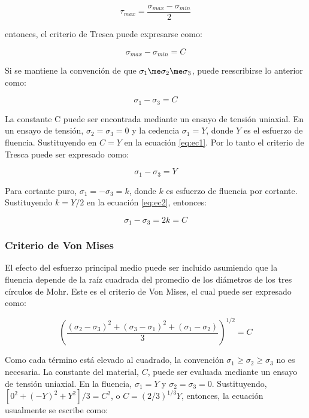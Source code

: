 \begin{equation}
\tau_{max} = \frac{\sigma_{max}-\sigma_{min}}{2}
\end{equation}

entonces, el criterio de Tresca puede expresarse como:

\begin{equation}
\sigma_{max} - \sigma_{min} = C
\end{equation}

Si se mantiene la convención de que $ \sigma_1 \me \sigma_2 \me \sigma_3 $, puede reescribirse lo anterior como:

\begin{equation}\label{eq:ec1}
\sigma_1 - \sigma_3 = C
\end{equation}

La constante C puede ser encontrada mediante un ensayo de tensión uniaxial. En un ensayo de tensión, 
$\sigma_2 = \sigma_3 = 0$ y la cedencia $\sigma_1 = Y$, donde $Y$ es el esfuerzo de fluencia. Sustituyendo 
en $C=Y$ en la ecuación \ref{eq:ec1}. Por lo tanto el criterio de Tresca puede ser expresado como:

\begin{equation}\label{eq:ec2}
\sigma_1 - \sigma_3 = Y
\end{equation}

Para cortante puro, $ \sigma_1 = -\sigma_3 = k$, donde $k$ es esfuerzo de fluencia por cortante. Sustituyendo 
$ k = Y/2 $ en la ecuación \ref{eq:ec2}, entonces:

\begin{equation}
\sigma_1 - \sigma_3 = 2k = C
\end{equation}

\subsubsection{Criterio de Von Mises}

El efecto del esfuerzo principal medio puede ser incluido asumiendo que la fluencia depende de la raíz cuadrada 
del promedio de los diámetros de los tres círculos de Mohr. Este es el criterio de Von Mises, el cual puede ser 
expresado como:

\begin{equation} \label{eq:ec3}
\left( \frac{ (\sigma_2-\sigma_3)^2 + (\sigma_3-\sigma_1 )^2 + (\sigma_1-\sigma_2)}{3} \right) ^{1/2} = C
\end{equation}

Como cada término está elevado al cuadrado, la convención $\sigma_1 \geq \sigma_2 \geq \sigma_3$ no es necesaria. 
La constante del material, $C$, puede ser evaluada mediante un ensayo de tensión uniaxial. En la fluencia, 
$\sigma_1 = Y$ y $\sigma_2 = \sigma_3 = 0$. Sustituyendo, $[0^2 + (-Y)^2 + Y^2]/3 = C^2$, o 
$C = (2/3)^{1/3} Y $, entonces, la ecuación usualmente se escribe como:

